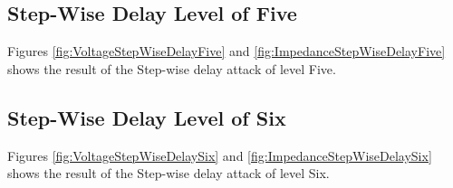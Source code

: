 \subsection{Step-Wise Delay Level of Five}
Figures \ref{fig:VoltageStepWiseDelayFive} and \ref{fig:ImpedanceStepWiseDelayFive} shows the result of the Step-wise delay attack of level Five.

\subsection{Step-Wise Delay Level of Six}
Figures \ref{fig:VoltageStepWiseDelaySix} and \ref{fig:ImpedanceStepWiseDelaySix} shows the result of the Step-wise delay attack of level Six.



